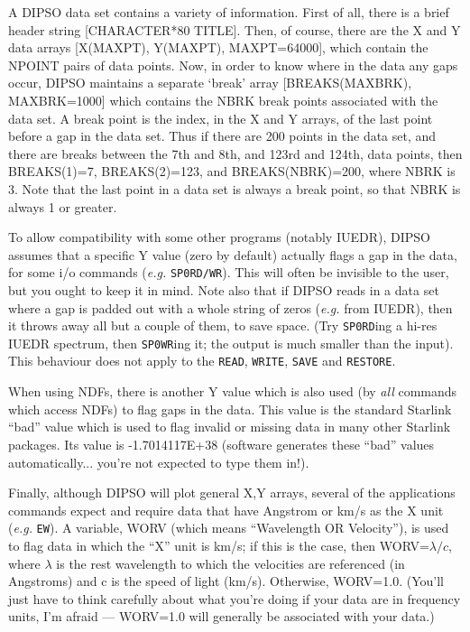 \documentclass[twoside,11pt]{article}
\newcommand{\htmlref}[2]{#1}
\renewcommand{\_}{\texttt{\symbol{95}}}
\begin{document}
A DIPSO data set contains a variety of information. First of all,
there is a brief header string [CHARACTER*80 TITLE]. Then, of course,
there are the X and Y data arrays [X(MAXPT), Y(MAXPT), MAXPT=64000],
which contain the NPOINT pairs of data points. Now, in order to know
where in the data any gaps occur, DIPSO maintains a separate `break'
array [BREAKS(MAXBRK), MAXBRK=1000] which contains the NBRK break
points associated with the data set. A break point is the index, in the
X and Y arrays, of the last point before a gap in the data set. Thus
if there are 200 points in the data set, and there are breaks between
the 7th and 8th, and 123rd and 124th, data points, then BREAKS(1)=7,
BREAKS(2)=123, and BREAKS(NBRK)=200, where NBRK is 3. Note that the
last point in a data set is always a break point, so that NBRK is
always 1 or greater.

To allow compatibility with some other programs (notably IUEDR), DIPSO
assumes that a specific Y value (zero by default) actually flags a gap
in the data, for some i/o commands ({\em e.g.} {\tt{SP0RD/WR}}).  This
will often be invisible to the user, but you ought to keep it in mind.
Note also that if DIPSO reads in a data set where a gap is padded out
with a whole string of zeros ({\em e.g.} from IUEDR), then it throws
away all but a couple of them, to save space. (Try \htmlref{{\tt{SP0RD}}}{COM:SP0RD}ing  a
hi-res IUEDR spectrum, then \htmlref{{\tt{SP0WR}}}{COM:SP0WR}ing  it; the output is much
smaller than the input). This behaviour does not apply to the \htmlref{{\tt{READ}}}{COM:READ}, 
\htmlref{{\tt{WRITE}}}{COM:WRITE},  \htmlref{{\tt{SAVE}}}{COM:SAVE}  and \htmlref{{\tt{RESTORE}}}{COM:RESTORE}. 

When using NDFs, there is another Y value which is also used (by {\em
all} commands which access NDFs) to flag gaps in the data. This value is
the standard Starlink ``bad'' value which is used to flag invalid or
missing data in many other Starlink packages. Its value is -1.7014117E+38
(software generates these ``bad'' values automatically... you're not
expected to type them in!).

Finally, although DIPSO will plot general X,Y arrays, several of the
applications commands expect and require data that have Angstrom or
km/s as the X unit ({\em e.g.} \htmlref{{\tt{EW}}}{COM:EW}).  A variable,
WORV (which means
``Wavelength OR Velocity''), is used to flag data in which the ``X''
unit is km/s; if this is the case, then WORV=$\lambda/c$, where
$\lambda$ is the rest wavelength to which the velocities are
referenced (in Angstroms) and c is the speed of light (km/s).
Otherwise, WORV=1.0. (You'll just have to think carefully about what
you're doing if your data are in frequency units, I'm afraid ---
WORV=1.0 will generally be associated with your data.)
\end{document}
